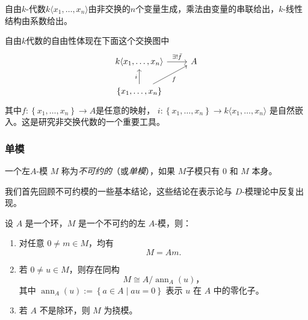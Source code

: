 \begin{example}
    自由$k$-代数$k\langle x_1,\ldots,x_n\rangle$由非交换的$n$个变量生成，乘法由变量的串联给出，$k$-线性结构由系数给出。
\end{example}
\begin{remark}
    自由$k$代数的自由性体现在下面这个交换图中
    \begin{equation*}
        \begin{tikzcd}
            k\langle x_1,\ldots,x_n\rangle \arrow[r,"\exists!\bar{f}"] & A \\
            \{x_1,\ldots,x_n\} \arrow[u, "i"] \arrow[ur, "f"']
        \end{tikzcd}
    \end{equation*}
    其中$f:\left\{x_1,\ldots,x_n\right\}\to A$是任意的映射， $i:\left\{x_1,\ldots,x_n\right\}\rightarrow k\langle x_1,\ldots,x_n\rangle$ 是自然嵌入。这是研究非交换代数的一个重要工具。
\end{remark}

\subsubsection{单模}
\begin{definition}
    一个左$A$-模 $M$ 称为\emph{不可约的}（或\emph{单模}），如果 $M$子模只有 $0$ 和 $M$ 本身。
\end{definition}
我们首先回顾不可约模的一些基本结论，这些结论在表示论与
$D$-模理论中反复出现。
\begin{proposition}
    设 $A$ 是一个环，$M$ 是一个不可约的左 $A$-模，则：
    \begin{enumerate}[label=(\arabic*)]
        \item 对任意 $0 \neq m \in M$，均有
              \[
                  M = Am.
              \]
        \item 若 $0 \neq u \in M$，则存在同构
              \[
                  M \cong A / \operatorname{ann}_A(u)，
              \]
              其中 $\operatorname{ann}_A(u):=\left\{a\in A\mid au=0\right\}$ 表示 $u$ 在 $A$ 中的零化子。
        \item 若 $A$ 不是除环，则 $M$ 为挠模。
    \end{enumerate}
\end{proposition}


